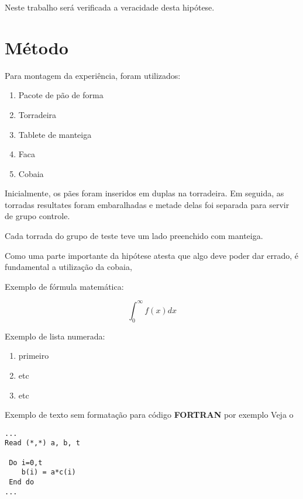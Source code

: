 Neste trabalho será verificada a veracidade desta hipótese.

\section{Método}
Para montagem da experiência, foram utilizados:
\begin{enumerate}
  \item{ Pacote de pão de forma }
  \item{Torradeira}
  \item{Tablete de manteiga}
  \item{Faca}
  \item{Cobaia}
\end{enumerate}

Inicialmente, os pães foram inseridos em duplas na torradeira. Em 
seguida, as torradas resultates foram embaralhadas e metade delas foi separada para
servir de grupo controle.

Cada torrada do grupo de teste teve um lado preenchido com manteiga.

Como uma parte importante da hipótese atesta que algo deve poder dar errado, é 
fundamental a utilização da cobaia, 

Exemplo de fórmula matemática:
\mbox{}

$$ \int_{0}^{\infty} f(x) dx $$

\vspace{0.5cm}

Exemplo de lista numerada:
\begin{enumerate}
  \item{ primeiro }
  \item{ etc }
  \item{ etc }
\end{enumerate}

\vspace{0.3cm}
Exemplo de texto sem formatação para código {\bf FORTRAN} por exemplo
Veja o %

\begin{verbatim}
...
Read (*,*) a, b, t

 Do i=0,t
    b(i) = a*c(i)
 End do
...

\end{verbatim}

